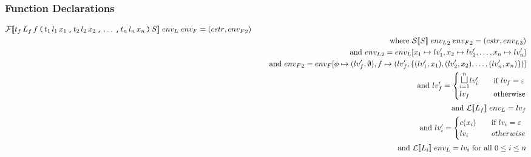 \subsubsection{Function Declarations}
\begin{align*}
& \iF\dblSq{t_f \, L_f \, f \tk ( t_1 \, l_1 \, x_1 \tk , t_2 \, l_2 \, x_2 \tk , \dots \tk , t_n \, l_n \, x_n \tk ) S} \; \ienvL \; \ienvF
  =  (\icstr, \ienvF_2) \\
& \seWhere{\iS\dblSq{S} \; \ienvL_2 \; \ienvF_2 = (\icstr, \ienvL_3)} \\
& \seAnd{\ienvL_2 = \ienvL[x_1 \mapsto \ilv_1', x_2 \mapsto \ilv_2', \dots, x_n \mapsto \ilv_n']} \\
& \seAnd{\ienvF_2 = \ienvF[\ifb \mapsto (\ilv_f', \emptyset), f \mapsto (\ilv_f', \{(\ilv_1', x_1), (\ilv_2', x_2), \dots, (\ilv_n', x_n)\})]} \\
& \seAnd{\ilv_f' = \begin{cases}
    \mathlarger\sqcupl_{i = 1}^n \ilv_i' & \quad \text{if } \ilv_f = \varepsilon \\
    \ilv_f & \quad \text{otherwise}
  \end{cases}} \\
& \seAnd{\iL\dblSq{L_f} \; \ienvL = \ilv_f} \\
& \seAnd{\ilv_i' = \begin{cases}
    c(x_i) & \quad \text{if } \ilv_i = \varepsilon \\
    \ilv_i & \quad otherwise
  \end{cases}} \\
& \seAnd{\iL\dblSq{L_i} \; \ienvL = \ilv_i \text{ for all } 0 \leq i \leq n}
\end{align*}

